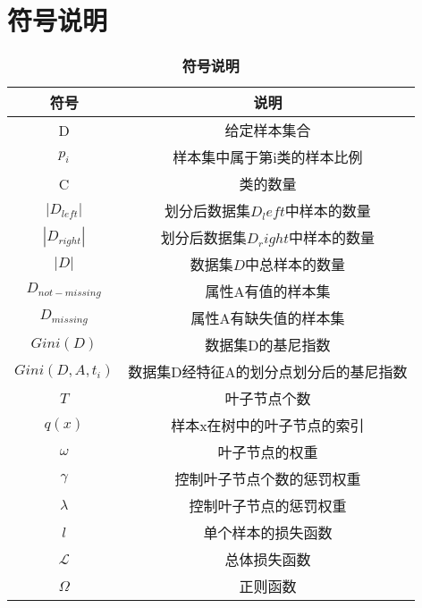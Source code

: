 \renewcommand{\arraystretch}{1.5}
\section{符号说明}
\begin{table}[H]
\caption{\textbf{符号说明}}%
\centering%
\begin{tabular}{cc}%
\toprule%
 符号 &说明\\
\midrule%
 D & 给定样本集合 \\
$p_i$ & 样本集中属于第i类的样本比例 \\
  C& 类的数量 \\
  $|D_{left}|$ & 划分后数据集$D_left$中样本的数量 \\
   $|D_{right}|$ & 划分后数据集$D_right$中样本的数量 \\
    $|D|$ & 数据集$D$中总样本的数量 \\
    $D_{not-missing}$&属性A有值的样本集\\
    $D_{missing}$&属性A有缺失值的样本集\\
     $Gini(D)$ & 数据集D的基尼指数 \\
     $Gini(D,A,t_i)$&数据集D经特征A的划分点划分后的基尼指数\\
     $T$&叶子节点个数\\
     $q(x)$&样本x在树中的叶子节点的索引\\
     $\omega$&叶子节点的权重\\
     $\gamma$&控制叶子节点个数的惩罚权重\\
     $\lambda$&控制叶子节点的惩罚权重\\
     $l$&单个样本的损失函数\\
     $\mathcal{L}$&总体损失函数\\
     $\Omega$&正则函数\\
\bottomrule%
\end{tabular}
\end{table}